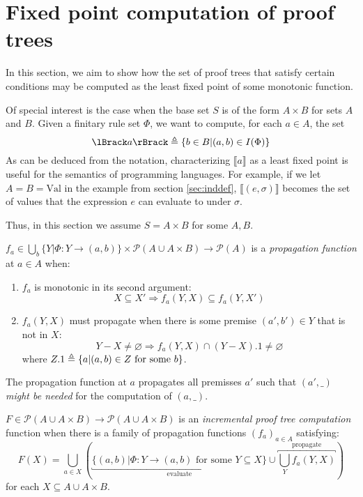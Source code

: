 \documentclass[12pt]{article}
\begin{document}
\section{Fixed point computation of proof trees}
In this section, we aim to show how the set of proof trees that satisfy certain conditions may be computed as the least fixed point of some monotonic function.

Of special interest is the case when the base set $S$ is of the form $A\times B$ for sets $A$ and $B$.
Given a finitary rule set $\Phi$, we want to compute, for each $a\in A$, the set
\[\lBrack a\rBrack\defeq\{b\in B|(a,b)\in I(\Phi)\}\]
As can be deduced from the notation, characterizing $\lBrack a\rBrack$ as a least fixed point is useful for the semantics of programming languages.
For example, if we let $A=B=\text{Val}$ in the example from section \ref{sec:inddef}, $\lBrack (e,\sigma)\rBrack$ becomes the set of values that the expression $e$ can evaluate to under $\sigma$.

Thus, in this section we assume $S=A\times B$ for some $A,B$.
\begin{definition}\label{def:propagation}
	$f_a\in\bigcup_b\{Y|\Phi:Y\rightarrow(a,b)\}\times\mathcal{P}(A\cup A\times B)\rightarrow\mathcal{P}(A)$ is a \emph{propagation function} at $a\in A$ when:
	\begin{enumerate}
		\item $f_a$ is monotonic in its second argument:
		      \[X\subseteq X'\Rightarrow f_a(Y,X)\subseteq f_a(Y,X')\]
		\item $f_a(Y,X)$ must propagate when there is some premise $(a',b')\in Y$ that is not in $X$:
		      \[Y-X\neq\varnothing\Rightarrow f_a(Y,X)\cap(Y-X).1\neq\varnothing\]
		      where $Z.1\triangleq\{a|(a,b)\in Z\text{ for some }b\}$.
	\end{enumerate}
\end{definition}

The propagation function at $a$ propagates all premisses $a'$ such that $(a',\_)$ \emph{might be needed} for the computation of $(a,\_)$.

\begin{definition}
	$F\in\mathcal{P}(A\cup A\times B)\rightarrow\mathcal{P}(A\cup A\times B)$ is an \emph{incremental proof tree computation} function when
	there is a family of propagation functions $(f_a)_{a\in A}$ satisfying:
	\[F(X)=\bigcup_{a\in X}\left(\underbracket{\{(a,b)|\Phi:Y\rightarrow(a,b)\text{ for some }Y\subseteq X\}}_{\text{evaluate}}\cup\overbracket{\bigcup_{Y}f_a(Y,X)}^{\text{propagate}}\right)\]
	for each $X\subseteq A\cup A\times B$.
\end{definition}
\end{document}

